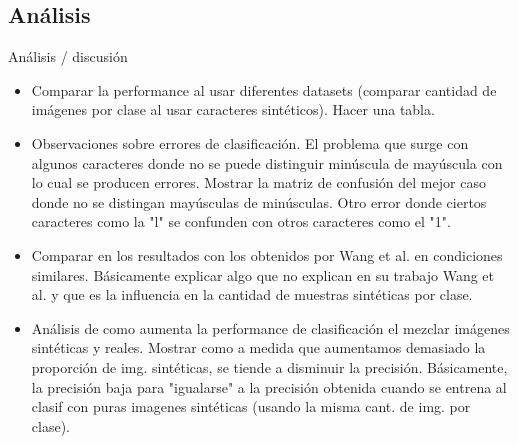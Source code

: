 \newpage
\subsection{Análisis}
	Análisis / discusión
	\begin{itemize}
		\item Comparar la performance al usar diferentes datasets (comparar cantidad de imágenes por clase al usar caracteres sintéticos). Hacer una tabla.
		\item Observaciones sobre errores de clasificación. El problema que surge con algunos caracteres donde no se puede distinguir minúscula de mayúscula con lo cual se producen errores. Mostrar la matriz de confusión del mejor caso donde no se distingan mayúsculas de minúsculas. Otro error donde ciertos caracteres como la "l" se confunden con otros caracteres como el "1".
		\item Comparar en los resultados con los obtenidos por Wang et al. en condiciones similares. Básicamente explicar algo que no explican en su trabajo Wang et al. y que es la influencia en la cantidad de muestras sintéticas por clase.
		\item Análisis de como aumenta la performance de clasificación el mezclar imágenes sintéticas y reales. Mostrar como a medida que aumentamos demasiado la proporción de img. sintéticas, se tiende a disminuir la precisión. Básicamente, la precisión baja para "igualarse" a la precisión obtenida cuando se entrena al clasif con puras imagenes sintéticas (usando la misma cant. de img. por clase).
	\end{itemize}